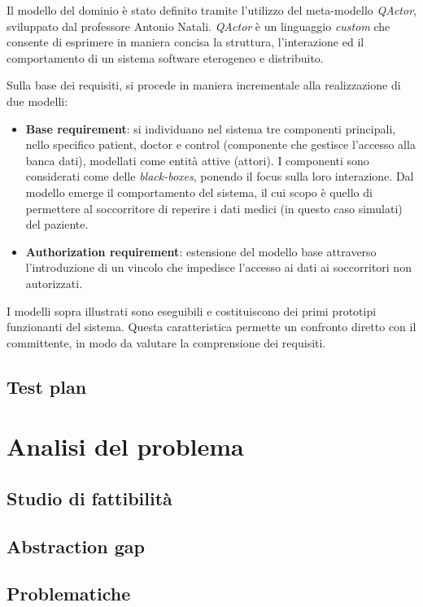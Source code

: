 \documentclass[a4paper,12pt]{report}
\begin{document}
Il modello del dominio è stato definito tramite l'utilizzo del meta-modello \emph{QActor}, sviluppato dal professore Antonio Natali. \emph{QActor} è un linguaggio \emph{custom} che consente di esprimere in maniera concisa la struttura, l'interazione ed il comportamento di un sistema software eterogeneo e distribuito.

Sulla base dei requisiti, si procede in maniera incrementale alla realizzazione di due modelli:
\begin{itemize}
	\item \textbf{Base requirement}: si individuano nel sistema tre componenti principali, nello specifico patient, doctor e control (componente che gestisce l'accesso alla banca dati), modellati come entità attive (attori). I componenti sono considerati come delle \emph{black-boxes}, ponendo il focus sulla loro interazione. Dal modello emerge il comportamento del sistema, il cui scopo è quello di permettere al soccorritore di reperire i dati medici (in questo caso simulati) del paziente.
	\item \textbf{Authorization requirement}: estensione del modello base attraverso l'introduzione di un vincolo che impedisce l'accesso ai dati ai soccorritori non autorizzati.
\end{itemize}
I modelli sopra illustrati sono eseguibili e costituiscono dei primi prototipi funzionanti del sistema. Questa caratteristica permette un confronto diretto con il committente, in modo da valutare la comprensione dei requisiti.

\section{Test plan}

\chapter{Analisi del problema}

\section{Studio di fattibilità}

\section{Abstraction gap}

\section{Problematiche}
\end{document}
